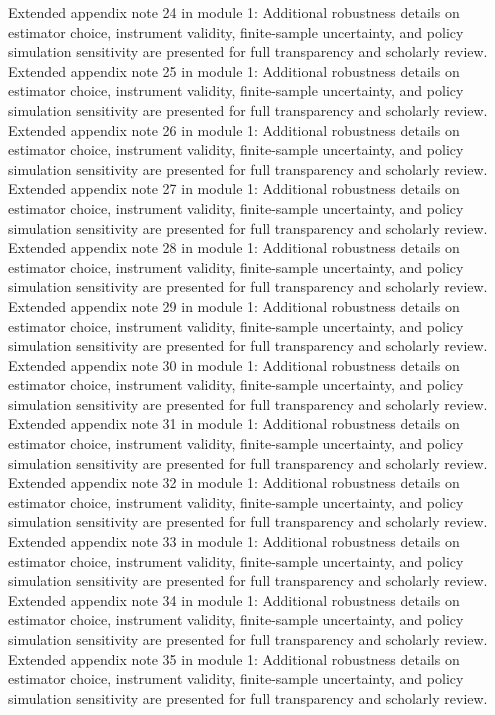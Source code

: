 \documentclass[preprint,12pt]{elsarticle}
\begin{document}
Extended appendix note 24 in module 1: Additional robustness details on estimator choice, instrument validity, finite-sample uncertainty, and policy simulation sensitivity are presented for full transparency and scholarly review.
Extended appendix note 25 in module 1: Additional robustness details on estimator choice, instrument validity, finite-sample uncertainty, and policy simulation sensitivity are presented for full transparency and scholarly review.
Extended appendix note 26 in module 1: Additional robustness details on estimator choice, instrument validity, finite-sample uncertainty, and policy simulation sensitivity are presented for full transparency and scholarly review.
Extended appendix note 27 in module 1: Additional robustness details on estimator choice, instrument validity, finite-sample uncertainty, and policy simulation sensitivity are presented for full transparency and scholarly review.
Extended appendix note 28 in module 1: Additional robustness details on estimator choice, instrument validity, finite-sample uncertainty, and policy simulation sensitivity are presented for full transparency and scholarly review.
Extended appendix note 29 in module 1: Additional robustness details on estimator choice, instrument validity, finite-sample uncertainty, and policy simulation sensitivity are presented for full transparency and scholarly review.
Extended appendix note 30 in module 1: Additional robustness details on estimator choice, instrument validity, finite-sample uncertainty, and policy simulation sensitivity are presented for full transparency and scholarly review.
Extended appendix note 31 in module 1: Additional robustness details on estimator choice, instrument validity, finite-sample uncertainty, and policy simulation sensitivity are presented for full transparency and scholarly review.
Extended appendix note 32 in module 1: Additional robustness details on estimator choice, instrument validity, finite-sample uncertainty, and policy simulation sensitivity are presented for full transparency and scholarly review.
Extended appendix note 33 in module 1: Additional robustness details on estimator choice, instrument validity, finite-sample uncertainty, and policy simulation sensitivity are presented for full transparency and scholarly review.
Extended appendix note 34 in module 1: Additional robustness details on estimator choice, instrument validity, finite-sample uncertainty, and policy simulation sensitivity are presented for full transparency and scholarly review.
Extended appendix note 35 in module 1: Additional robustness details on estimator choice, instrument validity, finite-sample uncertainty, and policy simulation sensitivity are presented for full transparency and scholarly review.
\end{document}
